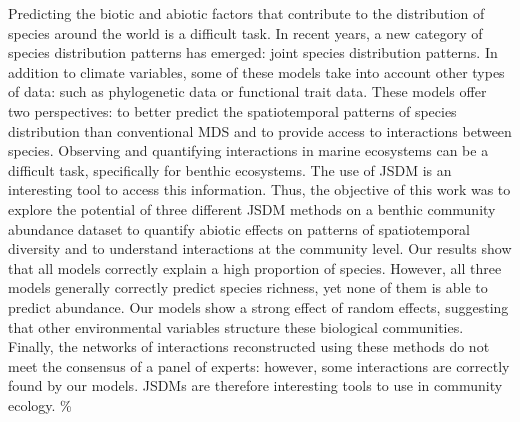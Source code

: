 \documentclass[12pt,]{article}
\begin{document}
Predicting the biotic and abiotic factors that contribute to the
distribution of species around the world is a difficult task. In recent
years, a new category of species distribution patterns has emerged:
joint species distribution patterns. In addition to climate variables,
some of these models take into account other types of data: such as
phylogenetic data or functional trait data. These models offer two
perspectives: to better predict the spatiotemporal patterns of species
distribution than conventional MDS and to provide access to interactions
between species. Observing and quantifying interactions in marine
ecosystems can be a difficult task, specifically for benthic ecosystems.
The use of JSDM is an interesting tool to access this information. Thus,
the objective of this work was to explore the potential of three
different JSDM methods on a benthic community abundance dataset to
quantify abiotic effects on patterns of spatiotemporal diversity and to
understand interactions at the community level. Our results show that
all models correctly explain a high proportion of species. However, all
three models generally correctly predict species richness, yet none of
them is able to predict abundance. Our models show a strong effect of
random effects, suggesting that other environmental variables structure
these biological communities. Finally, the networks of interactions
reconstructed using these methods do not meet the consensus of a panel
of experts: however, some interactions are correctly found by our
models. JSDMs are therefore interesting tools to use in community
ecology. \%

%
\end{document}
